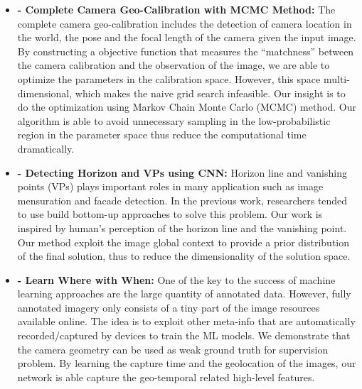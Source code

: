 \begin{itemize}[noitemsep]

  \item \textbf{ - 
  Complete Camera Geo-Calibration with MCMC Method:} \newline \newline
  The complete camera geo-calibration includes the detection of camera
  location in the world, the pose and the focal length of the camera
  given the input image. By constructing a objective function that
  measures the ``matchness'' between the camera calibration and the
  observation of the image, we are able to optimize the parameters in
  the calibration space. However, this space multi-dimensional, which
  makes the naive grid search infeasible. Our insight is to do the
  optimization using Markov Chain Monte Carlo (MCMC) method. Our
  algorithm is able to avoid unnecessary sampling in the
  low-probabilistic region in the parameter space thus reduce the
  computational time dramatically. \newline

  \item \textbf{ -
  Detecting Horizon and VPs using CNN:} \newline \newline
  Horizon line and vanishing points (VPs) plays important roles in many
  application such as image mensuration and facade detection. In the
  previous work, researchers tended to use build bottom-up approaches to
  solve this problem. Our work is inspired by human's perception of the
  horizon line and the vanishing point. Our method exploit the image
  global context to provide a prior distribution of the final solution,
  thus to reduce the dimensionality of the solution space. \newline

  \item \textbf{ -
  Learn Where with When:} \newline \newline
  One of the key to the success of machine learning approaches are the
  large quantity of annotated data. However, fully annotated imagery
  only consists of a tiny part of the image resources available online.
  The idea is to exploit other meta-info that are automatically
  recorded/captured by devices to train the ML models.  We demonstrate
  that the camera geometry can be used as weak ground truth for
  supervision problem. By learning the capture time and the geolocation
  of the images, our network is able capture the geo-temporal related
  high-level features. \newline


\end{itemize}
